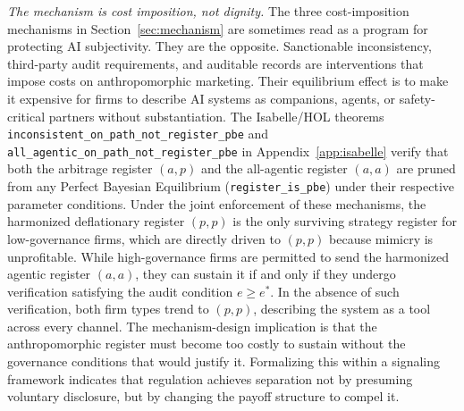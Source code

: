 \emph{The mechanism is cost imposition, not dignity.} The three cost-imposition mechanisms in Section~\ref{sec:mechanism} are sometimes read as a program for protecting AI subjectivity. They are the opposite. Sanctionable inconsistency, third-party audit requirements, and auditable records are interventions that impose costs on anthropomorphic marketing. Their equilibrium effect is to make it expensive for firms to describe AI systems as companions, agents, or safety-critical partners without substantiation. The Isabelle/HOL theorems \texttt{inconsistent\_\allowbreak{}on\_\allowbreak{}path\_\allowbreak{}not\_\allowbreak{}register\_\allowbreak{}pbe} and \texttt{all\_\allowbreak{}agentic\_\allowbreak{}on\_\allowbreak{}path\_\allowbreak{}not\_\allowbreak{}register\_\allowbreak{}pbe} in Appendix~\ref{app:isabelle} verify that both the arbitrage register $(a,p)$ and the all-agentic register $(a,a)$ are pruned from any Perfect Bayesian Equilibrium (\texttt{register\_\allowbreak{}is\_\allowbreak{}pbe}) under their respective parameter conditions. Under the joint enforcement of these mechanisms, the harmonized deflationary register $(p,p)$ is the only surviving strategy register for low-governance firms, which are directly driven to $(p,p)$ because mimicry is unprofitable. While high-governance firms are permitted to send the harmonized agentic register $(a,a)$, they can sustain it if and only if they undergo verification satisfying the audit condition $e \ge e^\ast$. In the absence of such verification, both firm types trend to $(p,p)$, describing the system as a tool across every channel. The mechanism-design implication is that the anthropomorphic register must become too costly to sustain without the governance conditions that would justify it. Formalizing this within a signaling framework indicates that regulation achieves separation not by presuming voluntary disclosure, but by changing the payoff structure to compel it.
